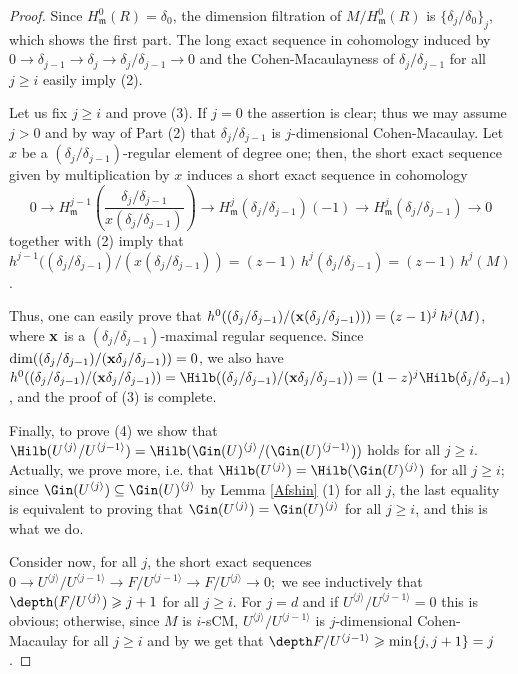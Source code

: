 \documentclass[12pt]{amsart}
\theoremstyle{definition}
\theoremstyle{definition}
\newcommand{\m}{\mathfrak{m}}
\renewcommand{\geq}{\geqslant}
\let\lra\longrightarrow
\begin{document}
  \begin{proof}
    Since $H^0_\mathfrak{m}(R)=\delta_0$, the dimension filtration of $M/H^0_\mathfrak{m}(R)$ is $\{\delta_j/\delta_0\}_j$, which shows the first part.    The long exact sequence in cohomology induced by $0 \to \delta_{j-1} \to \delta_j \to \delta_j/\delta_{j-1}\to 0$ and the Cohen-Macaulayness of $\delta_j/\delta_{j-1}$ for all $j\geq i$ easily imply (2).

    \smallskip
    \noindent
Let us fix $j\geq i$ and prove (3). If $j=0$ the assertion is clear; thus we may assume $j>0$  and by way of Part (2) that $\delta_j/\delta_{j-1}$ is $j$-dimensional Cohen-Macaulay. Let $x$ be a $(\delta_j/\delta_{j-1})$-regular element of degree one; then, the short exact sequence given by multiplication by $x$ induces a short exact sequence in cohomology  
$$0 \lra H_{\m}^{j-1}\left(\frac{\delta_{j}/\delta_{j-1}}{x(\delta_{j}/\delta_{j-1})}\right) \lra H^j_{\m}(\delta_{j}/\delta_{j-1})(-1) \lra H^j_{\m}(\delta_{j}/\delta_{j-1}) \lra 0$$ 
together with  (2) imply that $h^{j-1}((\delta_{j}/\delta_{j-1})/(x(\delta_{j}/\delta_{j-1}))=(z-1) \, h^j(\delta_{j}/\delta_{j-1})=(z-1) \, h^j(M)$.

Thus, one can easily prove that $h^{0}((\delta_{j}/\delta_{j-1})/({\bf x}(\delta_{j}/\delta_{j-1})))=(z-1)^j \, h^j(M)$, where  ${\bf x}$ is a $(\delta_j/\delta_{j-1})$-maximal regular sequence. Since $\dim((\delta_{j}/\delta_{j-1})/({\bf x}\delta_{j}/\delta_{j-1}))=0$, we also have $h^{0}((\delta_{j}/\delta_{j-1})/({\bf x}\delta_{j}/\delta_{j-1}))=\Hilb((\delta_{j}/\delta_{j-1})/({\bf x}\delta_{j}/\delta_{j-1})) = (1-z)^j\Hilb(\delta_{j}/\delta_{j-1})$, and the proof of (3) is complete.


\smallskip
\noindent
Finally, to prove (4) we  show that $\Hilb(U^{\langle j \rangle}/U^{\langle j-1 \rangle})=\Hilb(\Gin(U)^{\langle j \rangle}/(\Gin(U)^{\langle j-1 \rangle}))$ holds for all $j \geq i$. Actually, we prove more, i.e. that $\Hilb(U^{\langle j \rangle})=\Hilb(\Gin(U)^{\langle j \rangle})$ for all $j \geq i$; since $\Gin(U^{\langle j \rangle}) \subseteq \Gin(U)^{\langle j \rangle}$ by Lemma \ref{Afshin} (1) for all $j$,  the last equality is equivalent to proving that $\Gin(U^{\langle j \rangle}) = \Gin(U)^{\langle j \rangle}$ for all $j \geq i$, and this is what we do.

Consider now, for all $j$, the short exact sequences $0  \to U^{\langle j \rangle}/U^{\langle j-1 \rangle} \to F/U^{\langle j-1 \rangle} \to F/U^{\langle j \rangle} \to 0;$
we see inductively that $\depth(F/U^{\langle j \rangle}) \geq j+1$ for all $j \geq i$. For $j=d$ and if $U^{\langle j\rangle}/U^{\langle j-1\rangle}=0$ this is obvious; otherwise, since $M$ is $i$-sCM,  $U^{\langle j\rangle}/U^{\langle j-1\rangle}$ is $j$-dimensional Cohen-Macaulay for all $j\geq i$ and  by \cite[Proposition 1.2.9]{BH93} we get that
$\depth F/U^{\langle j-1\rangle}\geq \min\{ j, j+1\}=j$.


\end{proof}
\end{document}
